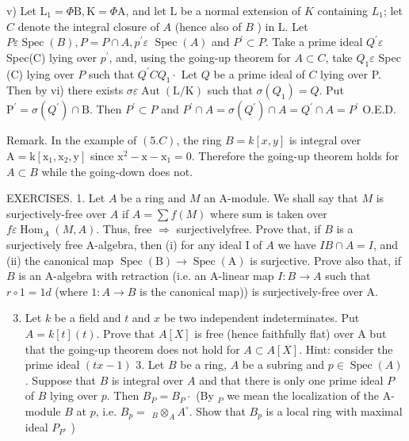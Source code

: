 v) Let $\mathrm{L}_{1}=\Phi \mathrm{B}, \mathrm{K}=\Phi \mathrm{A}$, and let $\mathrm{L}$ be a normal extension of $K$ containing $L_{1}$; let $C$ denote the integral closure of $A$ (hence also of $B$ ) in L. Let $P \varepsilon \operatorname{Spec}(B), P=P \cap A, p^{\prime} \varepsilon$ $\operatorname{Spec}(A)$ and $P^{\prime} \subset P$. Take a prime ideal $Q^{\prime} \varepsilon$ Spec(C) lying over $p^{\prime}$, and, using the going-up theorem for $A \subset C$, take $Q_{1} \varepsilon$ Spec (C) lying over $P$ such that $Q^{\prime} C Q_{1} \cdot$ Let $Q$ be a prime ideal of $C$ lying over P. Then by vi) there exists $\sigma \varepsilon \operatorname{Aut}(\mathrm{L} / \mathrm{K})$ such that $\sigma\left(Q_{1}\right)=Q$. Put $\mathrm{P}^{\prime}=\sigma\left(Q^{\prime}\right) \cap \mathrm{B} .$ Then $P^{\prime} \subset P$ and $P^{\prime} \cap A=\sigma\left(Q^{\prime}\right) \cap A=Q^{\prime} \cap A=P^{\prime}$ O.E.D.

Remark. In the example of $(5 . C)$, the ring $B=k[x, y]$ is integral over $\mathrm{A}=\mathrm{k}\left[\mathrm{x}_{1}, \mathrm{x}_{2}, \mathrm{y}\right]$ since $\mathrm{x}^{2}-\mathrm{x}-\mathrm{x}_{1}=0$. Therefore the going-up theorem holds for $A \subset B$ while the going-down does not.

EXERCISES. 1. Let $A$ be a ring and $M$ an A-module. We shall say that $M$ is surjectively-free over $A$ if $A=\sum f(M)$ where sum is taken over $f \varepsilon \operatorname{Hom}_{A}(M, A)$. Thus, free $\Rightarrow$ surjectivelyfree. Prove that, if $B$ is a surjectively free A-algebra, then (i) for any ideal I of $A$ we have $I B \cap A=I$, and (ii) the canonical map $\operatorname{Spec}(\mathrm{B}) \rightarrow \operatorname{Spec}(\mathrm{A})$ is surjective. Prove also that, if $B$ is an A-algebra with retraction (i.e. an A-linear map $I: B \rightarrow A$ such that $r \circ 1=1 d$ (where $1: A \rightarrow B$ is the canonical map)) is surjectively-free over A.

\begin{enumerate}
  \setcounter{enumi}{2}
  \item Let $k$ be a field and $t$ and $x$ be two independent indeterminates. Put $A=k[t](t)$. Prove that $A[X]$ is free (hence faithfully flat) over A but that the going-up theorem does not hold for $A \subset A[X]$. Hint: consider the prime ideal $(t x-1)$ 3. Let $B$ be a ring, $A$ be a subring and $p \in \operatorname{Spec}(A)$. Suppose that $B$ is integral over $A$ and that there is only one prime ideal $P$ of $B$ lying over $p .$ Then $B_{P}=B_{P} \cdot$ (By ${ }_{P}$ we mean the localization of the A-module $B$ at $p$, i.e. $B_{p}=$ ${ }_{B} \otimes_{A} A^{\circ}$. Show that $B_{p}$ is a local ring with maximal ideal $P_{P^{\circ}}$ )
\end{enumerate}
